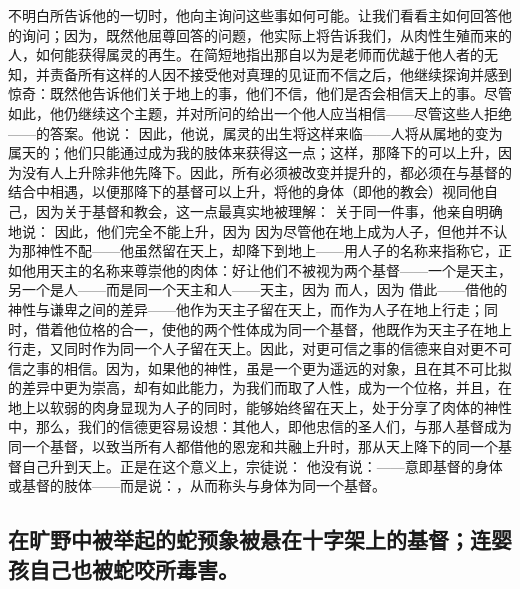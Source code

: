 不明白所告诉他的一切时，他向主询问这些事如何可能。让我们看看主如何回答他的询问；因为，既然他屈尊回答的问题，他实际上将告诉我们，从肉性生殖而来的人，如何能获得属灵的再生。在简短地指出那自以为是老师而优越于他人者的无知，并责备所有这样的人因不接受他对真理的见证而不信之后，他继续探询并感到惊奇：既然他告诉他们关于地上的事，他们不信，他们是否会相信天上的事。尽管如此，他仍继续这个主题，并对所问的给出一个他人应当相信——尽管这些人拒绝——的答案。他说： 因此，他说，属灵的出生将这样来临——人将从属地的变为属天的；他们只能通过成为我的肢体来获得这一点；这样，那降下的可以上升，因为没有人上升除非他先降下。因此，所有必须被改变并提升的，都必须在与基督的结合中相遇，以便那降下的基督可以上升，将他的身体（即他的教会）视同他自己，因为关于基督和教会，这一点最真实地被理解： 关于同一件事，他亲自明确地说： 因此，他们完全不能上升，因为 因为尽管他在地上成为人子，但他并不认为那神性不配——他虽然留在天上，却降下到地上——用人子的名称来指称它，正如他用天主的名称来尊崇他的肉体：好让他们不被视为两个基督——一个是天主，另一个是人——而是同一个天主和人——天主，因为 而人，因为 借此——借他的神性与谦卑之间的差异——他作为天主子留在天上，而作为人子在地上行走；同时，借着他位格的合一，使他的两个性体成为同一个基督，他既作为天主子在地上行走，又同时作为同一个人子留在天上。因此，对更可信之事的信德来自对更不可信之事的相信。因为，如果他的神性，虽是一个更为遥远的对象，且在其不可比拟的差异中更为崇高，却有如此能力，为我们而取了人性，成为一个位格，并且，在地上以软弱的肉身显现为人子的同时，能够始终留在天上，处于分享了肉体的神性中，那么，我们的信德更容易设想：其他人，即他忠信的圣人们，与那人基督成为同一个基督，以致当所有人都借他的恩宠和共融上升时，那从天上降下的同一个基督自己升到天上。正是在这个意义上，宗徒说： 他没有说：——意即基督的身体或基督的肢体——而是说：，从而称头与身体为同一个基督。\par


\subsection{在旷野中被举起的蛇预象被悬在十字架上的基督；连婴孩自己也被蛇咬所毒害。}

